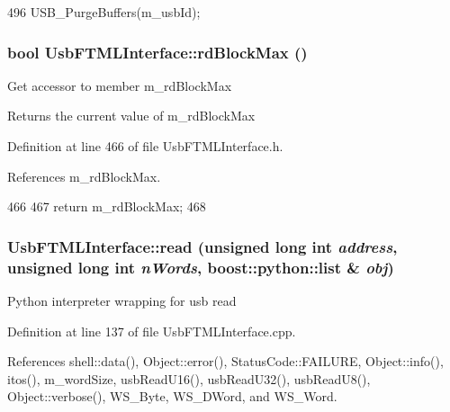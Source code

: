 \begin{DoxyCode}
496 {USB_PurgeBuffers(m_usbId);}
\end{DoxyCode}
\hypertarget{classUsbFTMLInterface_ac0a393da12305baa111deb699f7190cb}{
\subsubsection[{rdBlockMax}]{\setlength{\rightskip}{0pt plus 5cm}bool UsbFTMLInterface::rdBlockMax ()}}
\label{classUsbFTMLInterface_ac0a393da12305baa111deb699f7190cb}
Get accessor to member m\_\-rdBlockMax \begin{DoxyReturn}{Returns}
the current value of m\_\-rdBlockMax 
\end{DoxyReturn}


Definition at line 466 of file UsbFTMLInterface.h.

References m\_\-rdBlockMax.


\begin{DoxyCode}
466                      {
467     return m_rdBlockMax;
468   }
\end{DoxyCode}
\hypertarget{classUsbFTMLInterface_ae36cbbc258c8fc13b6c63f61bed4a8dc}{
\subsubsection[{read}]{ UsbFTMLInterface::read (unsigned long int {\em address}, \/  unsigned long int {\em nWords}, \/  boost::python::list \& {\em obj})}}
\label{classUsbFTMLInterface_ae36cbbc258c8fc13b6c63f61bed4a8dc}
Python interpreter wrapping for usb read 

Definition at line 137 of file UsbFTMLInterface.cpp.

References shell::data(), Object::error(), StatusCode::FAILURE, Object::info(), itos(), m\_\-wordSize, usbReadU16(), usbReadU32(), usbReadU8(), Object::verbose(), WS\_\-Byte, WS\_\-DWord, and WS\_\-Word.


